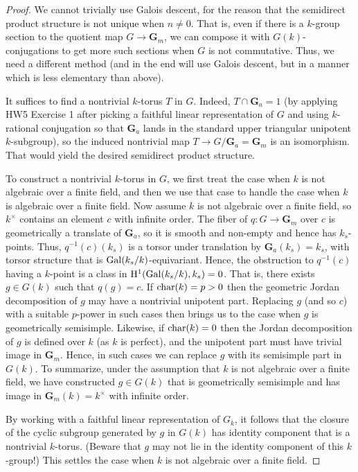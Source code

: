 \documentclass[10pt]{article}
\renewcommand{\(}{\left(}
\renewcommand{\)}{\right)}
\numberwithin{thm}{subsection}
\begin{document}
\begin{proof}
We cannot trivially use Galois descent, for the reason
that the semidirect product structure is not unique when $n \ne 0$.  That is, 
even if there is a $k$-group section to the quotient map
$G \rightarrow \mathbf{G}_m$, we can compose it with $G(k)$-conjugations
to get more such sections when $G$ is not commutative.  Thus, we need a different method
(and in the end will use Galois descent, but in a manner which is less elementary than above). 

It suffices to find a nontrivial $k$-torus $T$ in $G$.  Indeed, $T \cap \mathbf{G}_a = 1$
(by applying HW5 Exercise 1 after picking a faithful linear representation of $G$ and using
$k$-rational conjugation so that $\mathbf{G}_a$ lands in the standard upper triangular
unipotent $k$-subgroup), so the induced nontrivial map $T \rightarrow G/\mathbf{G}_a = \mathbf{G}_m$
is an isomorphism.  That would yield the desired semidirect product structure. 

To construct a nontrivial $k$-torus in $G$, we first treat the case when 
$k$ is not algebraic over a finite field, and then we use that case to handle
the case when $k$ is algebraic over a finite field.   Now assume
$k$ is not algebraic over a finite field, 
so $k^{\times}$ contains an element $c$ with infinite order.  The fiber of
$q:G \rightarrow \mathbf{G}_m$ over $c$ is geometrically a translate
of $\mathbf{G}_a$, so it is smooth and non-empty and hence has $k_s$-points.
Thus, $q^{-1}(c)(k_s)$ is a torsor under translation by $\mathbf{G}_a(k_s) = k_s$,
with torsor structure that is ${\rm{Gal}}(k_s/k)$-equivariant.  Hence, 
the obstruction to $q^{-1}(c)$ having a $k$-point is a class
in ${\rm{H}}^1({\rm{Gal}}(k_s/k), k_s) = 0$.  That is, there exists
$g \in G(k)$ such that $q(g) = c$.  If
${\rm{char}}(k) = p > 0$ then the geometric Jordan decomposition
of $g$ may have a nontrivial unipotent part.  Replacing $g$ (and so $c$)
with a suitable $p$-power in such cases then brings us to the case when
$g$ is geometrically semisimple.  Likewise, if
${\rm{char}}(k) = 0$ then the Jordan decomposition of
$g$ is defined over $k$ (as $k$ is perfect), and
the unipotent part must have trivial image in $\mathbf{G}_m$.  Hence,
in such cases we can replace $g$ with its semisimple part in $G(k)$.
To summarize, under the assumption that $k$ is not algebraic over a finite field,
we have constructed $g \in G(k)$ that is geometrically semisimple
and has image in $\mathbf{G}_m(k) = k^{\times}$ with
infinite order.

By working with a faithful linear representation of $G_{\overline{k}}$,
it follows that the closure of the cyclic subgroup generated by $g$ in $G(k)$
has identity component that is a nontrivial $k$-torus.  (Beware that $g$ may not lie
in the identity component of this $k$-group!)  This settles the case
when $k$ is not algebraic over a finite field.


\end{proof}
\end{document}
